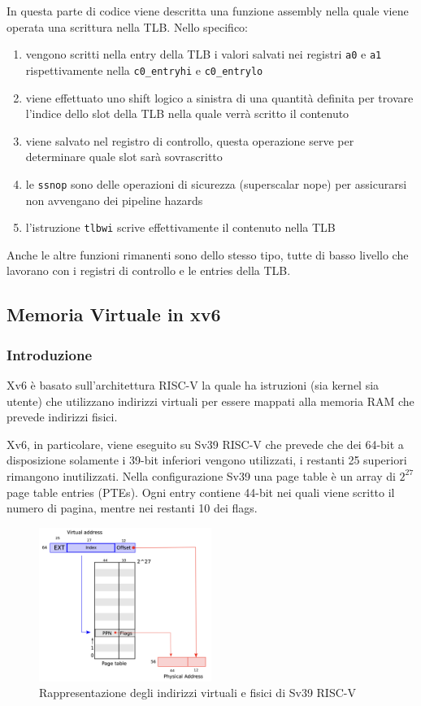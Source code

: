In questa parte di codice viene descritta una funzione assembly nella quale viene operata una scrittura nella TLB. Nello specifico:
\begin{enumerate}
    \item vengono scritti nella entry della TLB i valori salvati nei registri \lstinline{a0} e \lstinline{a1} rispettivamente nella \lstinline{c0_entryhi} e \lstinline{c0_entrylo}
    \item viene effettuato uno shift logico a sinistra di una quantità definita per trovare l'indice dello slot della TLB nella quale verrà scritto il contenuto
    \item viene salvato nel registro di controllo, questa operazione serve per determinare quale slot sarà sovrascritto
    \item le \lstinline{ssnop} sono delle operazioni di sicurezza (superscalar nope) per assicurarsi non avvengano dei pipeline hazards
    \item l'istruzione \lstinline{tlbwi} scrive effettivamente il contenuto nella TLB
\end{enumerate}
Anche le altre funzioni rimanenti sono dello stesso tipo, tutte di basso livello che lavorano con i registri di controllo e le entries della TLB.

\subsection{Memoria Virtuale in xv6}
\subsubsection{Introduzione}
Xv6 è basato sull'architettura RISC-V la quale ha istruzioni (sia kernel sia utente) che utilizzano indirizzi virtuali per essere mappati alla memoria RAM che prevede indirizzi fisici.

Xv6, in particolare, viene eseguito su Sv39 RISC-V che prevede che dei 64-bit a disposizione solamente i 39-bit inferiori vengono utilizzati, i restanti 25 superiori rimangono inutilizzati. Nella configurazione Sv39 una page table è un array di \(2^{27}\) page table entries (PTEs). Ogni entry contiene 44-bit nei quali viene scritto il numero di pagina, mentre nei restanti 10 dei flags.
\begin{figure}[hbt!]
    \centering
    \includegraphics[width=0.5\textwidth]{Memoria Virtuale/images/virtual memory xv6.png}
    \caption{Rappresentazione degli indirizzi virtuali e fisici di Sv39 RISC-V}
    \label{fgi:xv6_mem}
\end{figure}

